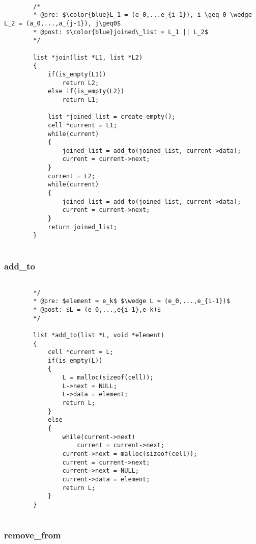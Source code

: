 \documentclass[a4paper, 11pt, oneside]{article}
\begin{document}
	\begin{lstlisting}[mathescape]	
	
		/*
		* @pre: $\color{blue}L_1 = (e_0,...e_{i-1}), i \geq 0 \wedge L_2 = (a_0,...,a_{j-1}), j\geq0$
		* @post: $\color{blue}joined\_list = L_1 || L_2$
		*/
		
		list *join(list *L1, list *L2)
		{
   			if(is_empty(L1))
      			return L2;
   			else if(is_empty(L2))
      			return L1;

   			list *joined_list = create_empty();
   			cell *current = L1;
   			while(current)
   			{
      			joined_list = add_to(joined_list, current->data);
      			current = current->next;
   			}
   			current = L2;
   			while(current)
   			{
      			joined_list = add_to(joined_list, current->data);
      			current = current->next;
   			}
   			return joined_list;
		}	
	
	\end{lstlisting}
	
	\subsubsection{add\_to}
	\begin{lstlisting}[mathescape]
	
		*/
		* @pre: $element = e_k$ $\wedge L = (e_0,...,e_{i-1})$
		* @post: $L = (e_0,...,e{i-1},e_k)$
		*/
		
		list *add_to(list *L, void *element)
		{
   			cell *current = L;
   			if(is_empty(L))
   			{
      			L = malloc(sizeof(cell));
      			L->next = NULL;
      			L->data = element;
      			return L;
   			}
   			else
   			{
      			while(current->next)
         			current = current->next;
      			current->next = malloc(sizeof(cell));
      			current = current->next;
      			current->next = NULL;
      			current->data = element;
      			return L;
   			}
		}	
		
	\end{lstlisting}
	
	\subsubsection{remove\_from}
	
	\begin{lstlisting}[mathescape]
	
	\end{lstlisting}
\end{document}
